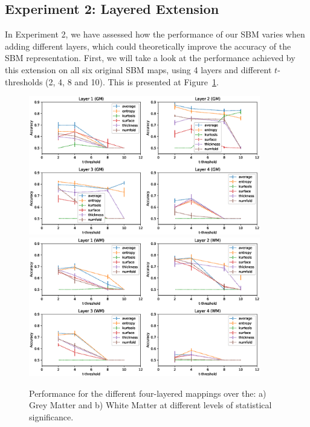 \subsection{Experiment 2: Layered Extension}
In Experiment 2, we have assessed how the performance of our \ac{SBM} varies when adding different layers, which could theoretically improve the accuracy of the \ac{SBM} representation. First, we will take a look at the performance achieved by this extension on all six original \ac{SBM} maps, using 4 layers and different $t$-thresholds (2, 4, 8 and 10). This is presented at Figure~\ref{fig:layeredPerf}. 

\begin{figure}[htp]
	\centering
	\includegraphics[width=0.9\textwidth]{Graphics/ch6/layerPerfGM}\\
	\includegraphics[width=0.9\textwidth]{Graphics/ch6/layerPerfWM}
	
	\caption[Performance of the four-layered mappings.]{Performance for the different four-layered mappings over the: a) Grey Matter and b) White Matter at different levels of statistical significance.}
	\label{fig:layeredPerf}
\end{figure}

